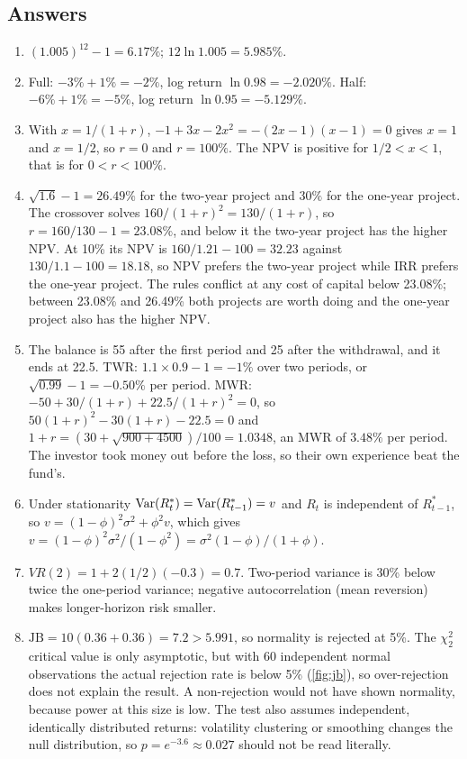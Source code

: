 \begin{chapterrefs}
\subsection*{Answers}
\begin{enumerate}[label=\textbf{\thechapter.\arabic*}, leftmargin=*]
  \item $(1.005)^{12}-1 = 6.17\%$; $12\ln 1.005 = 5.985\%$.
  \item Full: $-3\% + 1\% = -2\%$, log return $\ln 0.98 = -2.020\%$. Half: $-6\% + 1\% = -5\%$, log return
        $\ln 0.95 = -5.129\%$.
  \item With $x = 1/(1+r)$, $-1 + 3x - 2x^2 = -(2x-1)(x-1) = 0$ gives $x=1$ and $x=1/2$, so $r = 0$ and
        $r = 100\%$. The NPV is positive for $1/2 < x < 1$, that is for $0 < r < 100\%$.
  \item $\sqrt{1.6}-1 = 26.49\%$ for the two-year project and $30\%$ for the one-year project. The
        crossover solves $160/(1+r)^2 = 130/(1+r)$, so $r = 160/130 - 1 = 23.08\%$, and below it the
        two-year project has the higher NPV. At 10\% its NPV is $160/1.21-100 = 32.23$ against
        $130/1.1-100 = 18.18$, so NPV prefers the two-year project while IRR prefers the one-year
        project. The rules conflict at any cost of capital below 23.08\%; between 23.08\% and 26.49\%
        both projects are worth doing and the one-year project also has the higher NPV.
  \item The balance is 55 after the first period and 25 after the withdrawal, and it ends at 22.5. TWR:
        $1.1\times0.9-1 = -1\%$ over two periods, or $\sqrt{0.99}-1 = -0.50\%$ per period. MWR:
        $-50 + 30/(1+r) + 22.5/(1+r)^2 = 0$, so $50(1+r)^2 - 30(1+r) - 22.5 = 0$ and
        $1+r = (30+\sqrt{900+4500})/100 = 1.0348$, an MWR of $3.48\%$ per period. The investor took money out
        before the loss, so their own experience beat the fund's.
  \item Under stationarity $\operatorname{Var}(R^*_t) = \operatorname{Var}(R^*_{t-1}) = v$ and $R_t$ is independent of $R^*_{t-1}$, so
        $v = (1-\phi)^2\sigma^2 + \phi^2 v$, which gives $v = (1-\phi)^2\sigma^2/(1-\phi^2) = \sigma^2(1-\phi)/(1+\phi)$.
  \item $VR(2) = 1 + 2(1/2)(-0.3) = 0.7$. Two-period variance is 30\% below twice the one-period variance; negative
        autocorrelation (mean reversion) makes longer-horizon risk smaller.
  \item $\mathrm{JB} = 10(0.36 + 0.36) = 7.2 > 5.991$, so normality is rejected at 5\%. The $\chi^2_2$ critical value is only asymptotic, but with 60 independent normal observations the
        actual rejection rate is below 5\% (\cref{fig:jb}), so over-rejection does not explain the
        result. A non-rejection would not have shown normality, because power at this size is low. The
        test also assumes independent, identically distributed returns: volatility clustering or
        smoothing changes the null distribution, so $p=e^{-3.6}\approx0.027$ should not be read literally.
\end{enumerate}


\end{chapterrefs}
